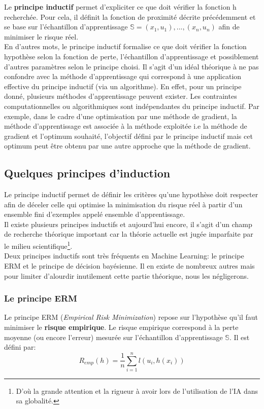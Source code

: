 \noindent Le \textbf{principe inductif} permet d'expliciter ce que doit vérifier la fonction h recherchée. Pour cela, il définit la fonction de proximité décrite précédemment et se base sur l'échantillon d'apprentissage $\mathbb{S}={(x_1,u_1),...,(x_n,u_n)}$ afin de minimiser le risque réel.\\

\noindent En d'autres mots, le principe inductif formalise ce que doit vérifier la fonction hypothèse selon la fonction de perte, l'échantillon d'apprentissage et possiblement d'autres paramètres selon le principe choisi. Il s'agit d'un idéal théorique à ne pas confondre avec la méthode d'apprentissage qui correspond à une application effective du principe inductif (via un algorithme). En effet, pour un principe donné, plusieurs méthodes d'apprentissage peuvent exister. Les contraintes computationnelles ou algorithmiques sont indépendantes du principe inductif. Par exemple, dans le cadre d'une optimisation par une méthode de gradient, la méthode d'apprentissage est associée à la méthode exploitée i.e la méthode de gradient et l'optimum souhaité, l'objectif défini par le principe inductif mais cet optimum peut être obtenu par une autre approche que la méthode de gradient.

\subsection{Quelques principes d'induction}
Le principe inductif permet de définir les critères qu'une hypothèse doit respecter afin de déceler celle qui optimise la minimisation du risque réel à partir d'un ensemble fini d'exemples appelé ensemble d'apprentissage.\\

\noindent Il existe plusieurs principes inductifs et aujourd'hui encore, il s'agit d'un champ de recherche théorique important car la théorie actuelle est jugée imparfaite par le milieu scientifique\footnote{D'où la grande attention et la rigueur à avoir lors de l'utilisation de l'IA dans sa globalité.}.\\

\noindent Deux principes inductifs sont très fréquents en Machine Learning: le principe ERM et le principe de décision bayésienne. Il en existe de nombreux autres mais pour limiter d'alourdir inutilement cette partie théorique, nous les négligerons.

\subsubsection{Le principe ERM}
Le principe ERM (\textit{Empirical Risk Minimization}) repose sur l'hypothèse qu'il faut minimiser le \textbf{risque empirique}. Le risque empirique correspond à la perte moyenne (ou encore l'erreur) mesurée sur l'échantillon d'apprentissage $\mathbb{S}$. Il est défini par:
$$R_{emp}(h)=\frac{1}{n}\sum_{i=1}^nl(u_i,h(x_i))$$

